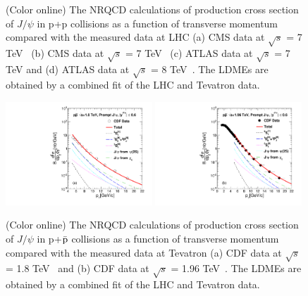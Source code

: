 \documentclass[12pt,a4paper,final]{iopart}
\begin{document}
\begin{figure}
\caption{(Color online) The NRQCD calculations of production cross section of $J/\psi$ in p+p collisions 
  as a function of transverse momentum compared with the measured data at LHC 
  (a) CMS data at $\sqrt{s}$ = 7 TeV~\cite{Chatrchyan:2011kc} 
  (b) CMS data at $\sqrt{s}$ = 7 TeV~\cite{Khachatryan:2015rra} 
  (c) ATLAS data at $\sqrt{s}$ = 7 TeV and
  (d) ATLAS data at $\sqrt{s}$ = 8 TeV~\cite{Aad:2015duc}. 
  The LDMEs are obtained by a combined fit of the LHC and Tevatron data.
}
\label{Fig:LDMEJPsi}
\end{figure}

\begin{figure}
\includegraphics[width=0.49\textwidth]{Fig6a_CDF_RootS180TeV_D2NDPtDy_PromptJPsi_Y0006_Pt.pdf}
\includegraphics[width=0.49\textwidth]{Fig6b_CDF_196TeV_D2NDPtDy_PromptJPsi_Y0006_Pt.pdf}
\caption{(Color online) 
  The NRQCD calculations of production cross section of $J/\psi$ in p+${\bar {\rm p}}$ collisions 
  as a function of transverse momentum compared with the measured data at Tevatron 
  (a) CDF data at $\sqrt{s}$ = 1.8 TeV~\cite{Abe:1997jz} and
  (b) CDF data at $\sqrt{s}$ = 1.96 TeV~\cite{Acosta:2004yw}. 
  The LDMEs are obtained by a combined fit of the LHC and Tevatron data.
}
\label{Fig:LDMEJPsiCDF}
\end{figure}
\end{document}
